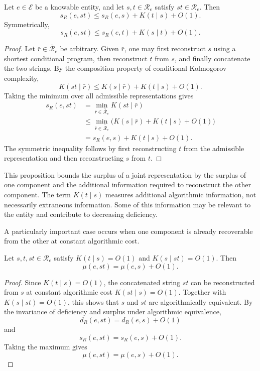 \begin{proposition}
\label{prop:decrease_joint_surplus}
Let $e\in\mathcal E$ be a knowable entity, and let $s,t\in\mathcal R_e$ satisfy $st\in\mathcal R_e$. Then
\[
s_R(e,st) \le s_R(e,s) + K(t\mid s) + O(1).
\]
Symmetrically,
\[
s_R(e,st) \le s_R(e,t) + K(s\mid t) + O(1).
\]
\end{proposition}
\begin{proof}
Let $\bar r\in\bar{\mathcal R}_e$ be arbitrary. Given $\bar r$, one may first reconstruct $s$ using a shortest conditional program, then reconstruct $t$ from $s$, and finally concatenate the two strings. By the composition property of conditional Kolmogorov complexity,
\[
K(st\mid\bar r) \le K(s\mid\bar r) + K(t\mid s) + O(1).
\]
Taking the minimum over all admissible representations gives
\[
\begin{aligned}
s_R(e,st)
& = \min_{\bar r\in\bar{\mathcal R}_e} K(st\mid\bar r)\\
& \le \min_{\bar r\in\bar{\mathcal R}_e} \bigl(K(s\mid\bar r)+K(t\mid s)+O(1) \bigr)\\
& = s_R(e,s)+K(t\mid s)+O(1).
\end{aligned}
\]
The symmetric inequality follows by first reconstructing $t$ from the admissible representation and then reconstructing $s$ from $t$.
\end{proof}

This proposition bounds the surplus of a joint representation by the surplus of one component and the additional information required to reconstruct the other component. The term $K(t\mid s)$ measures additional
algorithmic information, not necessarily extraneous information. Some of this information may be relevant to the entity and contribute to decreasing deficiency.

A particularly important case occurs when one component is already recoverable from the other at constant algorithmic cost.

\begin{corollary}
\label{cor:decrease_joint_redundancy}
Let $s,t,st\in\mathcal R_e$ satisfy $K(t\mid s)=O(1)$ and $K(s\mid st)=O(1)$. Then
\[
\mu(e,st)=\mu(e,s)+O(1).
\]
\end{corollary}
\begin{proof}
Since $K(t\mid s)=O(1)$, the concatenated string $st$ can be reconstructed from $s$ at constant algorithmic cost $K(st\mid s)=O(1)$. Together with $K(s\mid st)=O(1)$, this shows that $s$ and $st$ are algorithmically
equivalent. By the invariance of deficiency and surplus under algorithmic equivalence,
\[
d_R(e,st)=d_R(e,s)+O(1)
\]
and
\[
s_R(e,st)=s_R(e,s)+O(1).
\]
Taking the maximum gives
\[
\mu(e,st)=\mu(e,s)+O(1).
\]
\end{proof}

